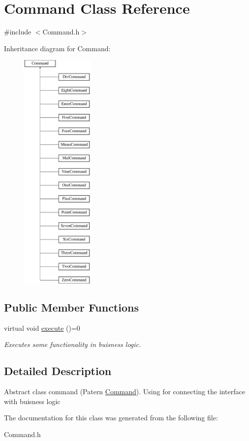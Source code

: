 \hypertarget{class_command}{}\section{Command Class Reference}
\label{class_command}


{\ttfamily \#include $<$Command.\+h$>$}

Inheritance diagram for Command\+:\begin{figure}[H]
\begin{center}
\leavevmode
\includegraphics[height=12.000000cm]{class_command}
\end{center}
\end{figure}
\subsection*{Public Member Functions}
\begin{DoxyCompactItemize}
\item 
\hypertarget{class_command_a6fd7d9bd8df8bfc881e4d6c7cd1878b7}{}virtual void \hyperlink{class_command_a6fd7d9bd8df8bfc881e4d6c7cd1878b7}{execute} ()=0\label{class_command_a6fd7d9bd8df8bfc881e4d6c7cd1878b7}

\begin{DoxyCompactList}\small\item\em Executes some functionality in buisness logic. \end{DoxyCompactList}\end{DoxyCompactItemize}


\subsection{Detailed Description}
Abstract class command (Patern \hyperlink{class_command}{Command}). Using for connecting the interface with buisness logic 

The documentation for this class was generated from the following file\+:\begin{DoxyCompactItemize}
\item 
Command.\+h\end{DoxyCompactItemize}
